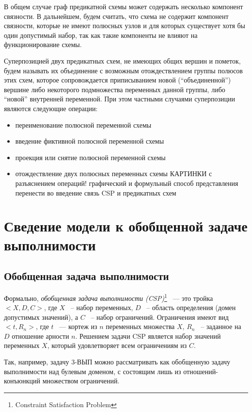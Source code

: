 \documentclass[12pt]{article}
\begin{document}
В общем случае граф предикатной схемы может содержать несколько компонент связности. 
В дальнейшем, будем считать, что схема не содержит компонент связности, 
которые не имеют полюсных узлов и для которых существует хотя бы один допустимый набор, так как такие компоненты не влияют на функционирование схемы.

Суперпозицией двух предикатных схем, не имеющих общих вершин и пометок, 
будем называть их объединение с возможным отождествлением группы полюсов этих схем, 
которое сопровождается приписыванием новой (``объединенной'') вершине либо 
некоторого подмножества переменных данной группы, либо ``новой'' внутренней переменной.
 При этом частными случаями суперпозиции являются следующие операции:
\begin{itemize}
\item переименование полюсной переменной схемы

\item введение фиктивной полюсной переменной схемы

\item проекция или снятие полюсной переменной схемы

\item отождествление двух полюсных переменных схемы
КАРТИНКИ с разъяснением операций! графический и формульный способ представления
перенести во введение связь CSP и предикатных схем
\end{itemize}

\section{Сведение модели к обобщенной задаче выполнимости}

\subsection{Обобщенная задача выполнимости}

Формально, \textit{обобщенная задача выполнимости (CSP)}\footnote{Constraint Satisfaction Problem} 
~--- это тройка $<X,D,C>$, где $X$ ~-- набор переменных, $D$ ~-- область определения (домен допустимых значений), 
а $C$ ~-- набор ограничений. Ограничения имеют вид $<t, R_n>$, где $t$ ~--- кортеж из $n$ переменных множества $X$, 
$R_n$ ~-- заданное на $D$ отношение арности $n$. 
Решением задачи CSP является набор значений переменных $X$, который удовлетворяет всем ограничениям из $C$. 

Так, например, задачу 3-ВЫП можно рассматривать как обобщенную задачу выполнимости над булевым доменом, с 
состоящим лишь из отношений-конъюнкций множеством ограничений.
\end{document}
